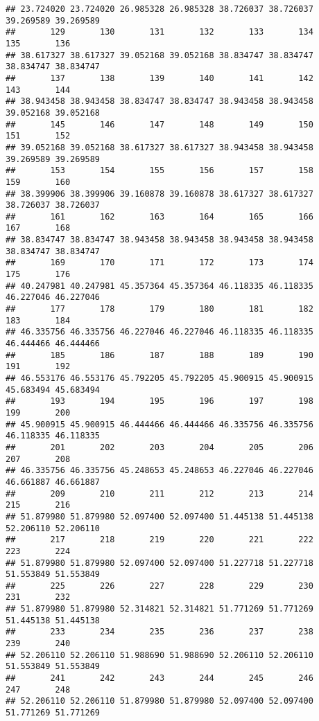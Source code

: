\documentclass[
]{article}
\begin{document}
\begin{verbatim}
## 23.724020 23.724020 26.985328 26.985328 38.726037 38.726037 39.269589 39.269589 
##       129       130       131       132       133       134       135       136 
## 38.617327 38.617327 39.052168 39.052168 38.834747 38.834747 38.834747 38.834747 
##       137       138       139       140       141       142       143       144 
## 38.943458 38.943458 38.834747 38.834747 38.943458 38.943458 39.052168 39.052168 
##       145       146       147       148       149       150       151       152 
## 39.052168 39.052168 38.617327 38.617327 38.943458 38.943458 39.269589 39.269589 
##       153       154       155       156       157       158       159       160 
## 38.399906 38.399906 39.160878 39.160878 38.617327 38.617327 38.726037 38.726037 
##       161       162       163       164       165       166       167       168 
## 38.834747 38.834747 38.943458 38.943458 38.943458 38.943458 38.834747 38.834747 
##       169       170       171       172       173       174       175       176 
## 40.247981 40.247981 45.357364 45.357364 46.118335 46.118335 46.227046 46.227046 
##       177       178       179       180       181       182       183       184 
## 46.335756 46.335756 46.227046 46.227046 46.118335 46.118335 46.444466 46.444466 
##       185       186       187       188       189       190       191       192 
## 46.553176 46.553176 45.792205 45.792205 45.900915 45.900915 45.683494 45.683494 
##       193       194       195       196       197       198       199       200 
## 45.900915 45.900915 46.444466 46.444466 46.335756 46.335756 46.118335 46.118335 
##       201       202       203       204       205       206       207       208 
## 46.335756 46.335756 45.248653 45.248653 46.227046 46.227046 46.661887 46.661887 
##       209       210       211       212       213       214       215       216 
## 51.879980 51.879980 52.097400 52.097400 51.445138 51.445138 52.206110 52.206110 
##       217       218       219       220       221       222       223       224 
## 51.879980 51.879980 52.097400 52.097400 51.227718 51.227718 51.553849 51.553849 
##       225       226       227       228       229       230       231       232 
## 51.879980 51.879980 52.314821 52.314821 51.771269 51.771269 51.445138 51.445138 
##       233       234       235       236       237       238       239       240 
## 52.206110 52.206110 51.988690 51.988690 52.206110 52.206110 51.553849 51.553849 
##       241       242       243       244       245       246       247       248 
## 52.206110 52.206110 51.879980 51.879980 52.097400 52.097400 51.771269 51.771269 

\end{verbatim}
\end{document}

